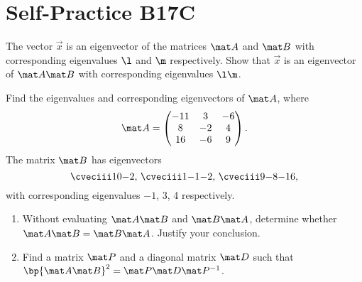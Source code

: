 \section{Self-Practice B17C}

\begin{problem}
    The vector $\vec x$ is an eigenvector of the matrices $\mat A$ and $\mat B$ with corresponding eigenvalues $\l$ and $\m$ respectively. Show that $\vec x$ is an eigenvector of $\mat A \mat B$ with corresponding eigenvalues $\l \m$.

    Find the eigenvalues and corresponding eigenvectors of $\mat A$, where \[\mat A = \begin{pmatrix}-11 & 3 & -6 \\ 8 & -2 & 4 \\ 16 & -6 & 9\end{pmatrix}.\] The matrix $\mat B$ has eigenvectors \[\cveciii10{-2}, \, \cveciii1{-1}{-2}, \, \cveciii9{-8}{-16},\] with corresponding eigenvalues $-1$, 3, 4 respectively.

    \begin{enumerate}
        \item Without evaluating $\mat A \mat B$ and $\mat B \mat A$, determine whether $\mat A \mat B = \mat B \mat A$. Justify your conclusion.
        \item Find a matrix $\mat P$ and a diagonal matrix $\mat D$ such that $\bp{\mat A \mat B}^2 = \mat P \mat D \mat P^{-1}$.
    \end{enumerate}
\end{problem}
